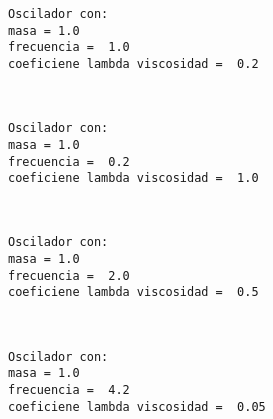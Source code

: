 \documentclass[11pt]{article}
\begin{document}
    \begin{Verbatim}[commandchars=\\\{\}]
Oscilador con:
masa = 1.0
frecuencia =  1.0
coeficiene lambda viscosidad =  0.2

    \end{Verbatim}

    \begin{center}
    \end{center}
    { \hspace*{\fill} \\}
    
    \begin{Verbatim}[commandchars=\\\{\}]
Oscilador con:
masa = 1.0
frecuencia =  0.2
coeficiene lambda viscosidad =  1.0

    \end{Verbatim}

    \begin{center}
    \end{center}
    { \hspace*{\fill} \\}
    
    \begin{Verbatim}[commandchars=\\\{\}]
Oscilador con:
masa = 1.0
frecuencia =  2.0
coeficiene lambda viscosidad =  0.5

    \end{Verbatim}

    \begin{center}
    \end{center}
    { \hspace*{\fill} \\}
    
    \begin{Verbatim}[commandchars=\\\{\}]
Oscilador con:
masa = 1.0
frecuencia =  4.2
coeficiene lambda viscosidad =  0.05

    \end{Verbatim}

    \begin{center}
    \end{center}
    { \hspace*{\fill} \\}
    
\end{document}

